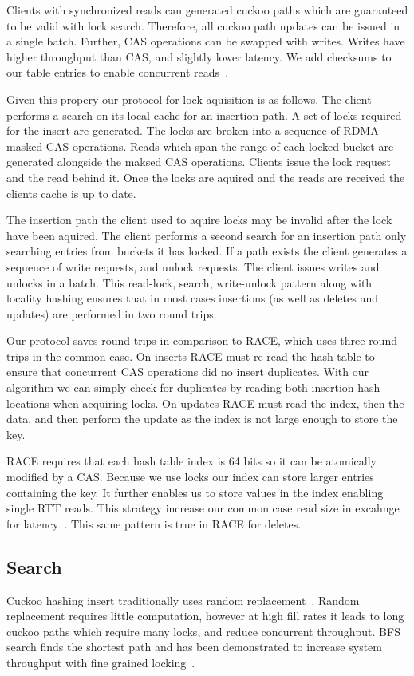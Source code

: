 Clients with synchronized reads can generated cuckoo paths
which are guaranteed to be valid with lock search.
Therefore, all cuckoo path updates can be issued in a single
batch. Further, CAS operations can be swapped with writes.
Writes have higher throughput than CAS, and slightly lower
latency. We add checksums to our table entries to enable
concurrent reads~\cite{pilaf,cell}.  ~

Given this propery our protocol for lock aquisition is as
follows. The client performs a search on its local cache for
an insertion path. A set of locks required for the insert
are generated. The locks are broken into a sequence of RDMA
masked CAS operations. Reads which span the range of each
locked bucket are generated alongside the maksed CAS
operations. Clients issue the lock request and the read
behind it. Once the locks are aquired and the reads are
received the clients cache is up to date.

The insertion path the client used to aquire locks may be
invalid after the lock have been aquired. The client
performs a second search for an insertion path only
searching entries from buckets it has locked. If a path
exists the client generates a sequence of write requests,
and unlock requests. The client issues writes and unlocks in
a batch. This read-lock, search, write-unlock pattern along
with locality hashing ensures that in most cases insertions
(as well as deletes and updates) are performed in two round
trips.

Our protocol saves round trips in comparison to RACE, which
uses three round trips in the common case. On inserts RACE
must re-read the hash table to ensure that concurrent CAS
operations did no insert duplicates. With our algorithm we
can simply check for duplicates by reading both insertion
hash locations when acquiring locks. On updates RACE must
read the index, then the data, and then perform the update
as the index is not large enough to store the key. 

RACE requires that each hash table index is 64 bits so it
can be atomically modified by a CAS. Because we use locks
our index can store larger entries containing the key. It
further enables us to store values in the index enabling
single RTT reads. This strategy increase our common case
read size in excahnge for latency~.
This same pattern is true in RACE for deletes. 

\subsection{Search}
Cuckoo hashing insert traditionally uses random
replacement~\cite{cuckoo}. Random replacement requires
little computation, however at high fill rates it leads to
long cuckoo paths which require many locks, and reduce
concurrent throughput. BFS search finds the shortest path
and has been demonstrated to increase system throughput with
fine grained locking~\cite{algorithmic-improvements}.

